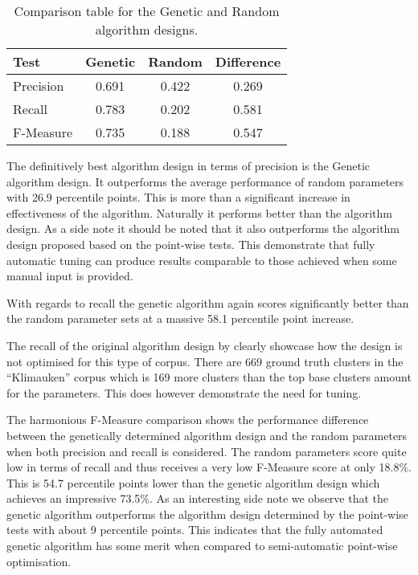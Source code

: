 \begin{table}[H]
\begin{center}
\begin{tabular}{|l|ccc|}
\hline
Test & 				Genetic 	& 	Random 	& Difference\\ 
\hline
Precision 		&	0.691 		& 	0.422		&  0.269\\ 
Recall 			&   0.783 		&   0.202  		&  0.581\\ 
F-Measure		& 	0.735		&	0.188 		&  0.547\\
\hline
\end{tabular}
\end{center}
\caption{Comparison table for the Genetic and Random algorithm designs.}
\label{tab:geneticrandomcomparison}
\end{table}

The definitively best algorithm design in terms of precision is the Genetic algorithm design. It outperforms the average performance of random parameters with 26.9 percentile points. This is more than a significant increase in effectiveness of the algorithm. Naturally it performs better than the \citeauthor{Oren1998} algorithm design. As a side note it should be noted that it also outperforms the algorithm design proposed based on the point-wise tests. This demonstrate that fully automatic tuning can produce results comparable to those achieved when some manual input is provided.

With regards to recall the genetic algorithm again scores significantly better than the random parameter sets at a massive 58.1 percentile point increase. 


The recall of the original algorithm design by \citeauthor{Oren1998} clearly showcase how the design is not optimised for this type of corpus. There are 669 ground truth clusters in the ``Klimauken'' corpus which is 169 more clusters than the top base clusters amount for the \citeauthor{Oren1998} parameters. This does however demonstrate the need for tuning.

The harmonious F-Measure comparison shows the performance difference between the genetically determined algorithm design and the random parameters when both precision and recall is considered. The random parameters score quite low in terms of recall and thus receives a very low F-Measure score at only 18.8\%. This is 54.7 percentile points lower than the genetic algorithm design which achieves an impressive 73.5\%. As an interesting side note we observe that the genetic algorithm outperforms the algorithm design determined by the point-wise tests with about 9 percentile points. This indicates that the fully automated genetic algorithm has some merit when compared to semi-automatic point-wise optimisation.

